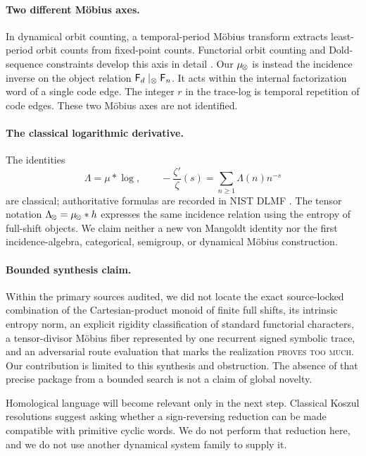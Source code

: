 \paragraph{Two different M\"obius axes.}
In dynamical orbit counting, a temporal-period M\"obius transform extracts
least-period orbit counts from fixed-point counts.  Functorial orbit counting
and Dold-sequence constraints develop this axis in detail
\citep{pakapongpunward2009,byszewskigraffward2021}.  Our $\mu_{\!\otimes}$ is instead
the incidence inverse on the object relation $\mathsf F_d\mid_\otimes\mathsf F_n$.  It
acts within the internal factorization word of a single code edge.  The
integer $r$ in the trace-log is temporal repetition of code edges.  These two
M\"obius axes are not identified.

\paragraph{The classical logarithmic derivative.}
The identities
\[
  \Lambda=\mu*\log,
  \qquad
  -\frac{\zeta'}{\zeta}(s)=\sum_{n\ge1}\Lambda(n)n^{-s}
\]
are classical; authoritative formulas are recorded in NIST DLMF
\citep{nistdlmf275}.  The tensor notation $\Lambda_{\!\otimes}=\mu_{\!\otimes}*h$ expresses the
same incidence relation using the entropy of full-shift objects.  We claim
neither a new von Mangoldt identity nor the first incidence-algebra,
categorical, semigroup, or dynamical M\"obius construction.

\paragraph{Bounded synthesis claim.}
Within the primary sources audited, we did not locate the exact source-locked
combination of the Cartesian-product monoid of finite full shifts, its
intrinsic entropy norm, an explicit rigidity classification of standard
functorial characters, a tensor-divisor M\"obius fiber represented by one
recurrent signed symbolic trace, and an adversarial route evaluation that
marks the realization \textsc{proves too much}.  Our contribution is limited
to this synthesis and obstruction.  The absence of that precise package from
a bounded search is not a claim of global novelty.

Homological language will become relevant only in the next step.  Classical
Koszul resolutions \citep{priddy1970} suggest asking whether a
sign-reversing reduction can be made compatible with primitive cyclic words.
We do not perform that reduction here, and we do not use another dynamical
system family to supply it.
